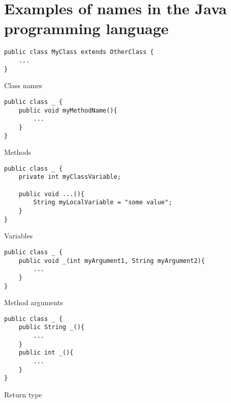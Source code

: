 \section{Examples of names in the Java programming language}
\label{appendix:java-nameabe-examples}

\begin{code}
\begin{verbatim}
public class MyClass extends OtherClass {
	...
}
\end{verbatim}
\caption{Class names}
\label{lst:example-class-names}
\end{code}

\begin{code}
\begin{verbatim}
public class _ {
	public void myMethodName(){
		...
	}
}
\end{verbatim}
\caption{Methods}
\label{lst:example-methods}
\end{code}

\begin{code}
\begin{verbatim}
public class _ {
	private int myClassVariable;
	
	public void ...(){
		String myLocalVariable = "some value";
	}
}
\end{verbatim}
\caption{Variables}
\label{lst:example-variables}
\end{code}

\begin{code}
\begin{verbatim}
public class _ {
	public void _(int myArgument1, String myArgument2){
		...
	}
}
\end{verbatim}
\caption{Method arguments}
\label{lst:example-method-arguments}
\end{code}

\begin{code}
\begin{verbatim}
public class _ {
	public String _(){
		...
	}
	public int _(){
		...
	}
}
\end{verbatim}
\caption{Return type}
\label{lst:example-return-types}
\end{code}
